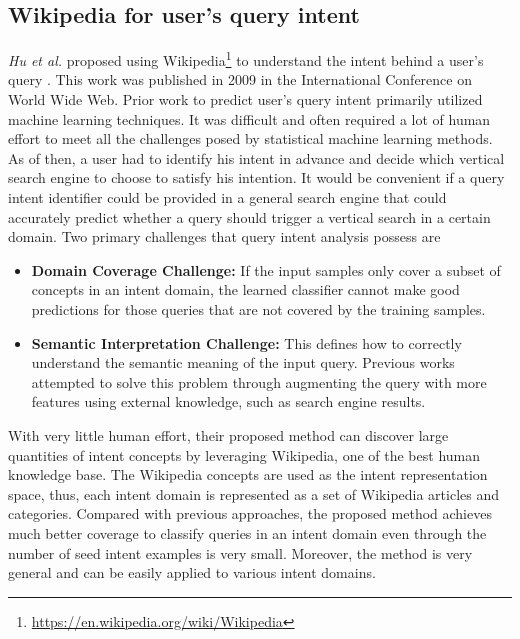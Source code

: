 \documentclass{report}
\begin{document}
\subsection{Wikipedia for user's query intent}
\label{sec:wikipedia}
\textit{Hu et al.} proposed using Wikipedia\footnote{\url{ https://en.wikipedia.org/wiki/Wikipedia}} to understand the intent behind a user's query \cite{huWiki09}.
This work was published in 2009 in the International Conference on World Wide Web. Prior work to predict
user's query intent primarily utilized machine learning techniques. It was difficult and often required
a lot of human effort to meet all the challenges posed by statistical machine learning methods. As of then,
a user had to identify his intent in advance and decide which vertical search engine to choose to satisfy
his intention. It would be convenient if a query intent identifier could be provided in a general search
engine that could accurately predict whether a query should trigger a vertical search in a certain domain.
Two primary challenges that query intent analysis possess are
\begin{itemize}
\item \textbf{Domain Coverage Challenge:} If the input samples only cover a subset of concepts in an 
intent domain, the learned classifier cannot make good predictions for those queries that are not covered
by the training samples.
\item \textbf{Semantic Interpretation Challenge:} This defines how to correctly understand the semantic
meaning of the input query. Previous works attempted to solve this problem through augmenting the query
with more features using external knowledge, such as search engine results.
\end{itemize}

With very little human effort, their proposed method can discover large quantities of intent concepts by
leveraging Wikipedia, one of the best human knowledge base. The Wikipedia concepts are used as the intent
representation space, thus, each intent domain is represented as a set of Wikipedia articles and categories.
Compared with previous approaches, the proposed method achieves much better coverage to classify queries
in an intent domain even through the number of seed intent examples is very small. Moreover, the method is
very general and can be easily applied to various intent domains.
\end{document}
